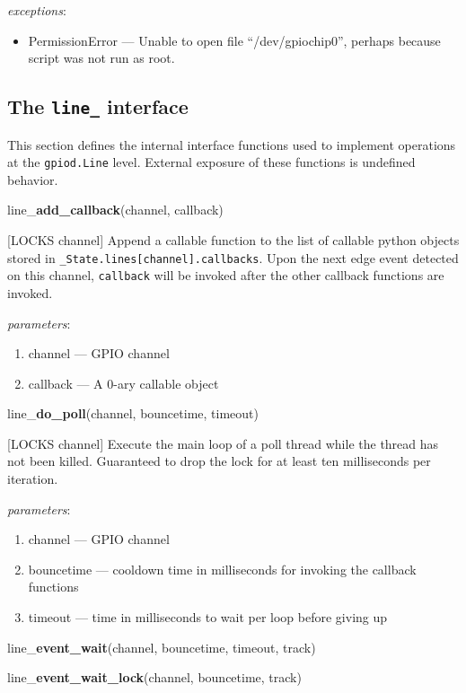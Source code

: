 \documentclass[12pt]{article}
\begin{document}
\textit{exceptions}:
\begin{itemize}
    \item PermissionError --- Unable to open file ``/dev/gpiochip0'', perhaps because script was not run as root.
\end{itemize}

\subsection{The \texttt{line\_} interface}

This section defines the internal interface functions used to implement operations at the \texttt{gpiod.Line} level. External exposure of these functions is undefined behavior.

\medskip

\noindent line\_\textbf{add\_callback}(channel, callback)

[LOCKS channel] Append a callable function to the list of callable python objects stored in \texttt{\_State.lines[channel].callbacks}. Upon the next edge event detected on this channel, \texttt{callback} will be invoked after the other callback functions are invoked. 

\textit{parameters}:
\begin{enumerate}      
        \item channel --- GPIO channel
        \item callback --- A 0-ary callable object
\end{enumerate}

\noindent line\_\textbf{do\_poll}(channel, bouncetime, timeout)

[LOCKS channel] Execute the main loop of a poll thread while the thread has not been killed. Guaranteed to drop the lock for at least ten milliseconds per iteration.

\textit{parameters}:
\begin{enumerate}      
        \item channel --- GPIO channel
        \item bouncetime --- cooldown time in milliseconds for invoking the callback functions
        \item timeout --- time in milliseconds to wait per loop before giving up
\end{enumerate}

\noindent line\_\textbf{event\_wait}(channel, bouncetime, timeout, track)

\noindent line\_\textbf{event\_wait\_lock}(channel, bouncetime, track)
\end{document}
